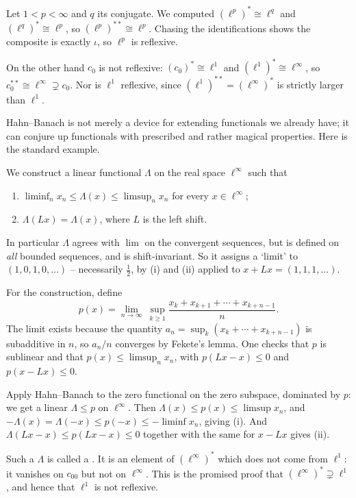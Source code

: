 \begin{example}
	Let $1 < p < \infty$ and $q$ its conjugate. We computed $(\ell^p)^* \cong \ell^q$ and $(\ell^q)^* \cong \ell^p$, so $(\ell^p)^{**} \cong \ell^p$. Chasing the identifications shows the composite is exactly $\iota$, so $\ell^p$ is reflexive.

	On the other hand $c_0$ is not reflexive: $(c_0)^* \cong \ell^1$ and $(\ell^1)^* \cong \ell^\infty$, so $c_0^{**} \cong \ell^\infty \supsetneq c_0$. Nor is $\ell^1$ reflexive, since $(\ell^1)^{**} = (\ell^\infty)^*$ is strictly larger than $\ell^1$.
\end{example}

Hahn--Banach is not merely a device for extending functionals we already have; it can conjure up functionals with prescribed and rather magical properties. Here is the standard example.

\begin{example}
	We construct a linear functional $\Lambda$ on the real space $\ell^\infty$ such that
	\begin{enumerate}[label=(\roman*)]
		\item $\liminf_n x_n \leq \Lambda(x) \leq \limsup_n x_n$ for every $x \in \ell^\infty$;
		\item $\Lambda(Lx) = \Lambda(x)$, where $L$ is the left shift.
	\end{enumerate}
	In particular $\Lambda$ agrees with $\lim$ on the convergent sequences, but is defined on \emph{all} bounded sequences, and is shift-invariant. So it assigns a `limit' to $(1,0,1,0,\dots)$ -- necessarily $\frac12$, by (i) and (ii) applied to $x + Lx = (1,1,1,\dots)$.

	For the construction, define
	$$p(x) = \lim_{n \to \infty}\ \sup_{k \geq 1} \frac{x_k + x_{k+1}+\cdots+x_{k+n-1}}{n}.$$
	The limit exists because the quantity $a_n = \sup_k(x_k + \cdots + x_{k+n-1})$ is subadditive in $n$, so $a_n/n$ converges by Fekete's lemma. One checks that $p$ is sublinear and that $p(x) \leq \limsup_n x_n$, with $p(Lx - x) \leq 0$ and $p(x - Lx)\leq 0$.

	Apply Hahn--Banach to the zero functional on the zero subspace, dominated by $p$: we get a linear $\Lambda \leq p$ on $\ell^\infty$. Then $\Lambda(x)\leq p(x)\leq\limsup x_n$, and $-\Lambda(x)=\Lambda(-x)\leq p(-x) \leq -\liminf x_n$, giving (i). And $\Lambda(Lx-x)\leq p(Lx-x)\leq0$ together with the same for $x - Lx$ gives (ii).

	Such a $\Lambda$ is called a . It is an element of $(\ell^\infty)^*$ which does not come from $\ell^1$: it vanishes on $c_{00}$ but not on $\ell^\infty$. This is the promised proof that $(\ell^\infty)^* \supsetneq \ell^1$, and hence that $\ell^1$ is not reflexive.
\end{example}

